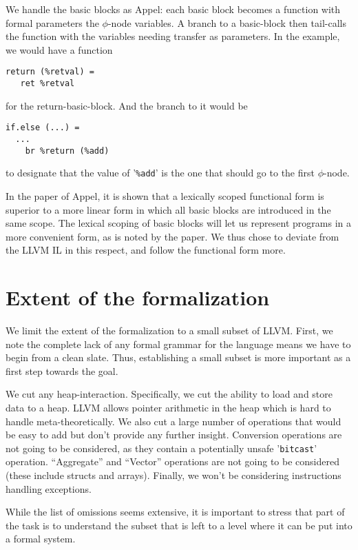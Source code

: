 \documentclass[a4paper, oneside, 10pt, draft]{memoir}
\begin{document}
We handle the basic blocks as Appel: each basic block becomes a
function with formal parameters the $\phi$-node variables. A branch to
a basic-block then tail-calls the function with the variables needing
transfer as parameters. In the example, we would have a function
\begin{verbatim}
return (%retval) =
   ret %retval
\end{verbatim}
for the return-basic-block. And the branch to it would be
\begin{verbatim}
if.else (...) =
  ...
    br %return (%add)
\end{verbatim}
to designate that the value of '\texttt{\%add}' is the one that should
go to the first $\phi$-node.

In the paper of Appel\cite{appel:1998:ssa}, it is shown that a
lexically scoped functional form is superior to a more linear form in
which all basic blocks are introduced in the same scope. The lexical
scoping of basic blocks will let us represent programs in a more
convenient form, as is noted by the paper. We thus chose to deviate
from the LLVM IL in this respect, and follow the functional form more.

\section{Extent of the formalization}

We limit the extent of the formalization to a small subset of
LLVM. First, we note the complete lack of any formal grammar for
the language means we have to begin from a clean slate. Thus,
establishing a small subset is more important as a first step towards
the goal.

We cut any heap-interaction. Specifically, we cut the ability to
load and store data to a heap. LLVM allows pointer arithmetic in the
heap which is hard to handle meta-theoretically. We also cut a large
number of operations that would be easy to add but don't provide
any further insight. Conversion operations are not going to be
considered, as they contain a potentially unsafe '\texttt{bitcast}'
operation. ``Aggregate'' and ``Vector'' operations are not going to be
considered (these include structs and arrays). Finally, we won't be
considering instructions handling exceptions.

While the list of omissions seems extensive, it is important to stress
that part of the task is to understand the subset that is left to a
level where it can be put into a formal system.
\end{document}
